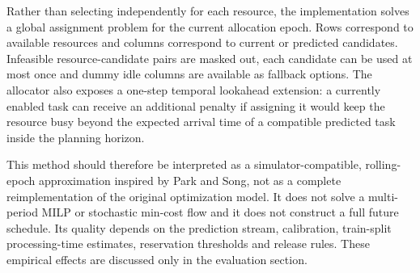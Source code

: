 Rather than selecting independently for each resource, the implementation solves
a global assignment problem for the current allocation epoch. Rows correspond to
available resources and columns correspond to current or predicted candidates.
Infeasible resource-candidate pairs are masked out, each candidate can be used at
most once and dummy idle columns are available as fallback options. The allocator
also exposes a one-step temporal lookahead extension: a currently enabled task
can receive an additional penalty if assigning it would keep the resource busy
beyond the expected arrival time of a compatible predicted task inside the
planning horizon.

This method should therefore be interpreted as a simulator-compatible,
rolling-epoch approximation inspired by Park and Song, not as a complete
reimplementation of the original optimization model. It does not solve a
multi-period MILP or stochastic min-cost flow and it does not construct a full
future schedule. Its quality depends on the prediction stream, calibration,
train-split processing-time estimates, reservation thresholds and release rules.
These empirical effects are discussed only in the evaluation section.
